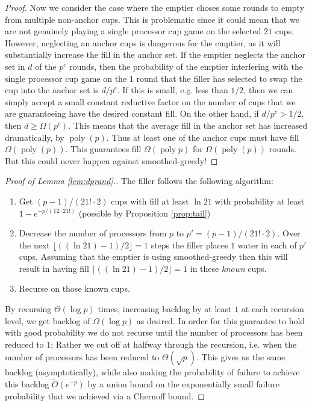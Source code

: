 \documentclass{article}[11pt]
\DeclareMathOperator{\poly}{\text{poly}}
\begin{document}
\begin{proof}
  Now we consider the case where the emptier choses some rounds to empty from
  multiple non-anchor cups. This is problematic since it could mean that we
  are not genuinely playing a single processor cup game on the selected $21$ cups.
  However, neglecting an anchor cups is dangerous for the emptier, as it will
  substantially increase the fill in the anchor set. If the emptier neglects
  the anchor set in $d$ of the $p^c$ rounds, then the probability of the
  emptier interfering with the single processor cup game on the $1$ round that
  the filler has selected to swap the cup into the anchor set is $d/p^c$. If
  this is small, e.g. less than $1/2$, then we can simply accept a small
  constant reductive factor on the number of cups that we are guaranteeing have
  the desired constant fill. On the other hand, if $d/p^c > 1/2$, then $d \ge \Omega(p^c)$. 
  This means that the average fill in the anchor set has increased dramatically, by $\poly(p)$.
  Thus at least one of the anchor cups must have fill $\Omega(\poly(p))$. This
  guarantees fill $\Omega(\poly p)$ for $\Omega(\poly(p))$ rounds. But this
  could never happen against smoothed-greedy! 

\end{proof}


\begin{proof}[Proof of Lemma \ref{lem:dprand}.]
  The filler follows the following algorithm:
  \begin{enumerate}
    \item Get $(p-1)/(21! \cdot 2)$ cups with fill at least $\ln 21$ with probability at
      least $1-e^{-p/(12\cdot 21!)}$ (possible by Proposition \ref{prop:tail})
    \item Decrease the number of processors from $p$ to $p' = (p-1)/(21!\cdot 2)$.
      Over the next $\lfloor ((\ln 21)-1)/2 \rfloor = 1$ steps the filler places $1$
      water in each of $p'$ cups. Assuming that the emptier is using smoothed-greedy then this
      will result in having fill $\lfloor ((\ln 21)-1) /2 \rfloor = 1$ in these \emph{known} cups.
    \item Recurse on those known cups. 
  \end{enumerate}
  By recursing $\Theta(\log p)$ times, increasing backlog by at least $1$ at
  each recursion level, we get backlog of $\Omega(\log p)$ as desired.
  In order for this guarantee to hold with good probability we do not recurse
  until the number of processors has been reduced to $1$; Rather we cut off at 
  halfway through the recursion, i.e. when the number of processors has been
  reduced to $\Theta(\sqrt{p})$. This gives us the same backlog (asymptotically), 
  while also making the probability of failure to achieve this backlog
  $\tilde{O}(e^{-p})$ by a union bound on the exponentially small failure
  probability that we achieved via a Chernoff bound.
\end{proof}
\end{document}
